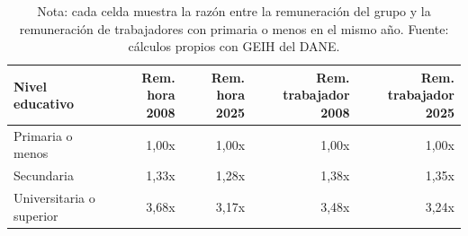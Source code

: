 \begin{table}[H]
\centering
\caption{Brechas relativas frente a primaria o menos, 2008 y 2025}
\label{tab:remuneracion_educacion_brechas}
\small
\begin{tabular}{@{}p{4.2cm}rrrr@{}}
\toprule
Nivel educativo & Rem. hora 2008 & Rem. hora 2025 & Rem. trabajador 2008 & Rem. trabajador 2025 \\
\midrule
Primaria o menos & 1,00x & 1,00x & 1,00x & 1,00x \\
Secundaria & 1,33x & 1,28x & 1,38x & 1,35x \\
Universitaria o superior & 3,68x & 3,17x & 3,48x & 3,24x \\
\bottomrule
\end{tabular}
\caption*{\footnotesize Nota: cada celda muestra la razón entre la remuneración del grupo y la remuneración de trabajadores con primaria o menos en el mismo año. Fuente: cálculos propios con GEIH del DANE.}
\end{table}
